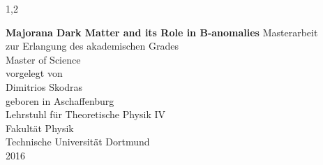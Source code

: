 \documentclass[11pt,a4paper,twoside]{article}
\numberwithin{equation}{section}
\begin{document}
\begin{spacing}{1,2}

%
%


\newcommand{\thetitle}{Majorana Dark Matter and its Role in B-anomalies}

\thispagestyle{empty}
\begin{center}

\Huge\textbf{\thetitle}
\vfill
\vfill
\Large
Masterarbeit\\ zur Erlangung des akademischen Grades \\ Master of Science \\
\vspace{20pt}
\normalsize
vorgelegt von \\[5pt]
{\Large Dimitrios Skodras} \\[5pt]
geboren in Aschaffenburg \\
\vspace{20pt}
Lehrstuhl für Theoretische Physik IV \\ Fakultät Physik \\
Technische Universität Dortmund \\ 2016
\end{center}
\newpage


\end{spacing}
\end{document}

